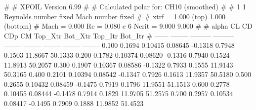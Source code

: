 #  
#       XFOIL         Version 6.99
#  
# Calculated polar for: CH10 (smoothed)                                 
#  
# 1 1 Reynolds number fixed          Mach number fixed         
#  
# xtrf =   1.000 (top)        1.000 (bottom)  
# Mach =   0.000     Re =     0.080 e 6     Ncrit =   9.000  9.000
#  
#   alpha    CL        CD       CDp       CM     Top_Xtr  Bot_Xtr  Top_Itr  Bot_Itr
#  ------ -------- --------- --------- -------- -------- -------- -------- --------
   0.100   0.1694   0.10415   0.08645  -0.1318   0.7948   0.1503  11.8667  50.1333
   0.200   0.1782   0.10374   0.08620  -0.1316   0.7940   0.1524  11.8913  50.2057
   0.300   0.1907   0.10367   0.08586  -0.1322   0.7933   0.1555  11.9143  50.3165
   0.400   0.2101   0.10394   0.08542  -0.1347   0.7926   0.1613  11.9357  50.5180
   0.500   0.2655   0.10432   0.08459  -0.1475   0.7919   0.1796  11.9551  51.1513
   0.600   0.2778   0.10455   0.08444  -0.1478   0.7914   0.1829  11.9705  51.2575
   0.700   0.2957   0.10534   0.08417  -0.1495   0.7909   0.1888  11.9852  51.4523
